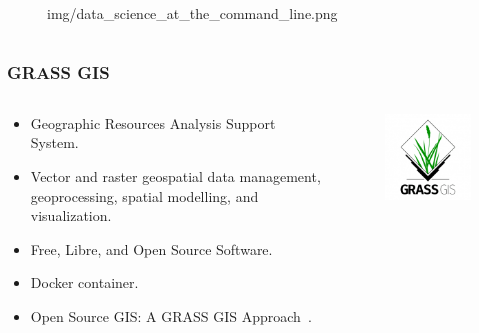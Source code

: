 \documentclass[aspectratio=169]{beamer}
\begin{document}
\begin{frame}
\begin{columns}
\begin{column}{0.5\textwidth}
\begin{figure}
                {img/data_science_at_the_command_line.png}
            \end{figure}
        \end{column}
    \end{columns}
\end{frame}

\begin{frame}
    \frametitle{GRASS GIS}
    \begin{columns}
        \begin{column}{0.5\textwidth}
            \begin{itemize}
                \item Geographic Resources Analysis Support System.
                \item Vector and raster geospatial data management, 
                    geoprocessing, spatial modelling, and visualization.
                \item Free, Libre, and Open Source Software.
                \item Docker container.
                \item Open Source GIS: A GRASS GIS Approach~\cite{neteler2008}.
            \end{itemize}
        \end{column}
        \begin{column}{0.5\textwidth}
            \begin{figure}
                \centering
                \includegraphics[scale=0.5]{logos/grassgis.png}
            \end{figure}
        \end{column}
    \end{columns}
\end{frame}
\end{document}
